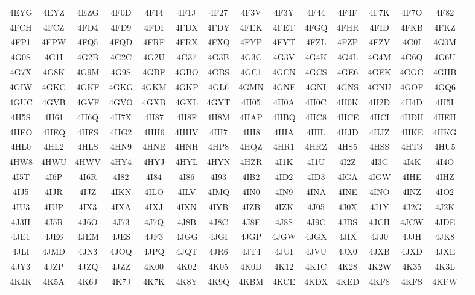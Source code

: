 \begin{longtable}{ c c c c c c c c c c c c c c c }
	4EYG & 4EYZ & 4EZG & 4F0D & 4F14 & 4F1J & 4F27 & 4F3V & 4F3Y & 4F44 & 4F4F & 4F7K & 4F7O & 4F82  \\
	4FCH & 4FCZ & 4FD4 & 4FD9 & 4FDI & 4FDX & 4FDY & 4FEK & 4FET & 4FGQ & 4FHR & 4FID & 4FKB & 4FKZ  \\
	4FP1 & 4FPW & 4FQ5 & 4FQD & 4FRF & 4FRX & 4FXQ & 4FYP & 4FYT & 4FZL & 4FZP & 4FZV & 4G0I & 4G0M  \\
	4G0S & 4G1I & 4G2B & 4G2C & 4G2U & 4G37 & 4G3B & 4G3C & 4G3V & 4G4K & 4G4L & 4G4M & 4G6Q & 4G6U  \\
	4G7X & 4G8K & 4G9M & 4G9S & 4GBF & 4GBO & 4GBS & 4GC1 & 4GCN & 4GCS & 4GE6 & 4GEK & 4GGG & 4GHB  \\
	4GIW & 4GKC & 4GKF & 4GKG & 4GKM & 4GKP & 4GL6 & 4GMN & 4GNE & 4GNI & 4GNS & 4GNU & 4GOF & 4GQ6  \\
	4GUC & 4GVB & 4GVF & 4GVO & 4GXB & 4GXL & 4GYT & 4H05 & 4H0A & 4H0C & 4H0K & 4H2D & 4H4D & 4H5I  \\
	4H5S & 4H61 & 4H6Q & 4H7X & 4H87 & 4H8F & 4H8M & 4HAP & 4HBQ & 4HC8 & 4HCE & 4HCI & 4HDH & 4HEH  \\
	4HEO & 4HEQ & 4HFS & 4HG2 & 4HH6 & 4HHV & 4HI7 & 4HI8 & 4HIA & 4HIL & 4HJD & 4HJZ & 4HKE & 4HKG  \\
	4HL0 & 4HL2 & 4HLS & 4HN9 & 4HNE & 4HNH & 4HP8 & 4HQZ & 4HR1 & 4HRZ & 4HS5 & 4HSS & 4HT3 & 4HU5  \\
	4HW8 & 4HWU & 4HWV & 4HY4 & 4HYJ & 4HYL & 4HYN & 4HZR & 4I1K & 4I1U & 4I2Z & 4I3G & 4I4K & 4I4O  \\
	4I5T & 4I6P & 4I6R & 4I82 & 4I84 & 4I86 & 4I93 & 4IB2 & 4ID2 & 4ID3 & 4IGA & 4IGW & 4IHE & 4IHZ  \\
	4IJ5 & 4IJR & 4IJZ & 4IKN & 4ILO & 4ILV & 4IMQ & 4IN0 & 4IN9 & 4INA & 4INE & 4INO & 4INZ & 4IO2  \\
	4IU3 & 4IUP & 4IX3 & 4IXA & 4IXJ & 4IXN & 4IYB & 4IZB & 4IZK & 4J05 & 4J0X & 4J1Y & 4J2G & 4J2K  \\
	4J3H & 4J5R & 4J6O & 4J73 & 4J7Q & 4J8B & 4J8C & 4J8E & 4J8S & 4J9C & 4JBS & 4JCH & 4JCW & 4JDE  \\
	4JE1 & 4JE6 & 4JEM & 4JES & 4JF3 & 4JGG & 4JGI & 4JGP & 4JGW & 4JGX & 4JIX & 4JJ0 & 4JJH & 4JK8  \\
	4JLI & 4JMD & 4JN3 & 4JOQ & 4JPQ & 4JQT & 4JR6 & 4JT4 & 4JUI & 4JVU & 4JX0 & 4JXB & 4JXD & 4JXE  \\
	4JY3 & 4JZP & 4JZQ & 4JZZ & 4K00 & 4K02 & 4K05 & 4K0D & 4K12 & 4K1C & 4K28 & 4K2W & 4K35 & 4K3L  \\
	4K4K & 4K5A & 4K6J & 4K7J & 4K7K & 4K8Y & 4K9Q & 4KBM & 4KCE & 4KDX & 4KED & 4KF8 & 4KFS & 4KFW  \\

\end{longtable}
